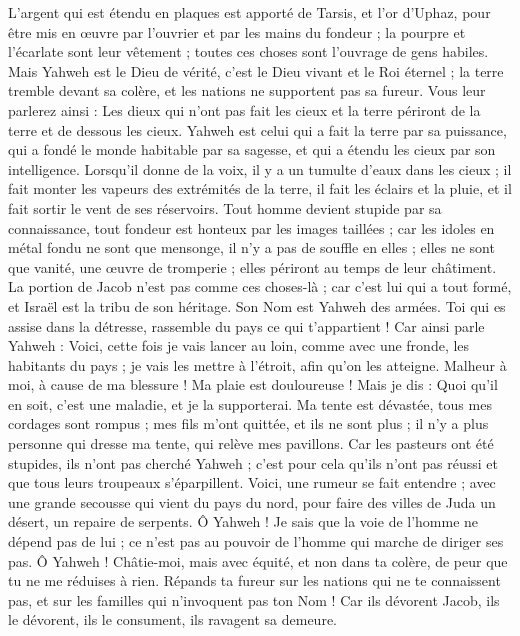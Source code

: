 \begin{multicols}{2}
L'argent qui est étendu en plaques est apporté de Tarsis, et l'or d'Uphaz, pour être mis en œuvre par l'ouvrier et par les mains du fondeur ; la pourpre et l'écarlate sont leur vêtement ; toutes ces choses sont l'ouvrage de gens habiles.
Mais Yahweh est le Dieu de vérité, c'est le Dieu vivant et le Roi éternel ; la terre tremble devant sa colère, et les nations ne supportent pas sa fureur.
Vous leur parlerez ainsi : Les dieux qui n'ont pas fait les cieux et la terre périront de la terre et de dessous les cieux.
Yahweh est celui qui a fait la terre par sa puissance, qui a fondé le monde habitable par sa sagesse, et qui a étendu les cieux par son intelligence.
Lorsqu’il donne de la voix, il y a un tumulte d'eaux dans les cieux ; il fait monter les vapeurs des extrémités de la terre, il fait les éclairs et la pluie, et il fait sortir le vent de ses réservoirs.
Tout homme devient stupide par sa connaissance, tout fondeur est honteux par les images taillées ; car les idoles en métal fondu ne sont que mensonge, il n'y a pas de souffle en elles ;
elles ne sont que vanité, une œuvre de tromperie ; elles périront au temps de leur châtiment.
La portion de Jacob n'est pas comme ces choses-là ; car c'est lui qui a tout formé, et Israël est la tribu de son héritage. Son Nom est Yahweh des armées.
Toi qui es assise dans la détresse, rassemble du pays ce qui t’appartient !
Car ainsi parle Yahweh : Voici, cette fois je vais lancer au loin, comme avec une fronde, les habitants du pays ; je vais les mettre à l'étroit, afin qu'on les atteigne.
Malheur à moi, à cause de ma blessure ! Ma plaie est douloureuse ! Mais je dis : Quoi qu'il en soit, c'est une maladie, et je la supporterai.
Ma tente est dévastée, tous mes cordages sont rompus ; mes fils m’ont quittée, et ils ne sont plus ; il n'y a plus personne qui dresse ma tente, qui relève mes pavillons.
Car les pasteurs ont été stupides, ils n'ont pas cherché Yahweh ; c'est pour cela qu’ils n’ont pas réussi et que tous leurs troupeaux s’éparpillent.
Voici, une rumeur se fait entendre ; avec une grande secousse qui vient du pays du nord, pour faire des villes de Juda un désert, un repaire de serpents.
Ô Yahweh ! Je sais que la voie de l'homme ne dépend pas de lui ; ce n'est pas au pouvoir de l'homme qui marche de diriger ses pas.
Ô Yahweh ! Châtie-moi, mais avec équité, et non dans ta colère, de peur que tu ne me réduises à rien.
Répands ta fureur sur les nations qui ne te connaissent pas, et sur les familles qui n'invoquent pas ton Nom ! Car ils dévorent Jacob, ils le dévorent, ils le consument, ils ravagent sa demeure.

\end{multicols}
